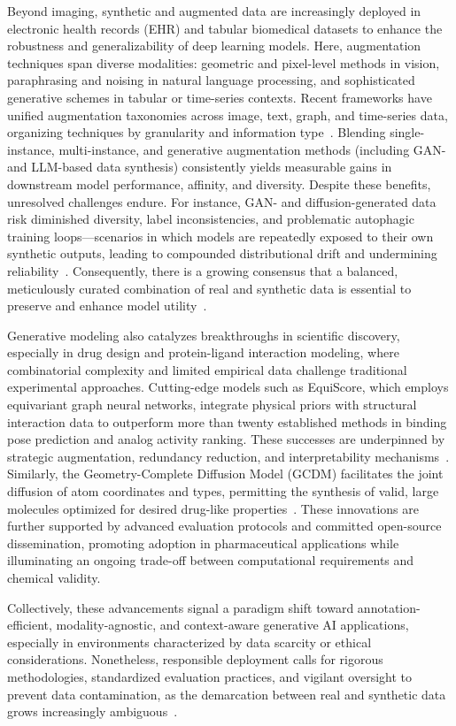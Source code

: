 \documentclass[sigconf]{acmart}
\begin{document}
Beyond imaging, synthetic and augmented data are increasingly deployed in electronic health records (EHR) and tabular biomedical datasets to enhance the robustness and generalizability of deep learning models. Here, augmentation techniques span diverse modalities: geometric and pixel-level methods in vision, paraphrasing and noising in natural language processing, and sophisticated generative schemes in tabular or time-series contexts. Recent frameworks have unified augmentation taxonomies across image, text, graph, and time-series data, organizing techniques by granularity and information type~\cite{ref62,ref63,ref64}. Blending single-instance, multi-instance, and generative augmentation methods (including GAN- and LLM-based data synthesis) consistently yields measurable gains in downstream model performance, affinity, and diversity. Despite these benefits, unresolved challenges endure. For instance, GAN- and diffusion-generated data risk diminished diversity, label inconsistencies, and problematic autophagic training loops---scenarios in which models are repeatedly exposed to their own synthetic outputs, leading to compounded distributional drift and undermining reliability~\cite{ref89,ref90}. Consequently, there is a growing consensus that a balanced, meticulously curated combination of real and synthetic data is essential to preserve and enhance model utility~\cite{ref89}.

Generative modeling also catalyzes breakthroughs in scientific discovery, especially in drug design and protein-ligand interaction modeling, where combinatorial complexity and limited empirical data challenge traditional experimental approaches. Cutting-edge models such as EquiScore, which employs equivariant graph neural networks, integrate physical priors with structural interaction data to outperform more than twenty established methods in binding pose prediction and analog activity ranking. These successes are underpinned by strategic augmentation, redundancy reduction, and interpretability mechanisms~\cite{ref59}. Similarly, the Geometry-Complete Diffusion Model (GCDM) facilitates the joint diffusion of atom coordinates and types, permitting the synthesis of valid, large molecules optimized for desired drug-like properties~\cite{ref74}. These innovations are further supported by advanced evaluation protocols and committed open-source dissemination, promoting adoption in pharmaceutical applications while illuminating an ongoing trade-off between computational requirements and chemical validity.

Collectively, these advancements signal a paradigm shift toward annotation-efficient, modality-agnostic, and context-aware generative AI applications, especially in environments characterized by data scarcity or ethical considerations. Nonetheless, responsible deployment calls for rigorous methodologies, standardized evaluation practices, and vigilant oversight to prevent data contamination, as the demarcation between real and synthetic data grows increasingly ambiguous~\cite{ref34,ref62,ref63,ref64,ref65,ref74,ref75,ref81,ref82,ref89,ref90}.
\end{document}

